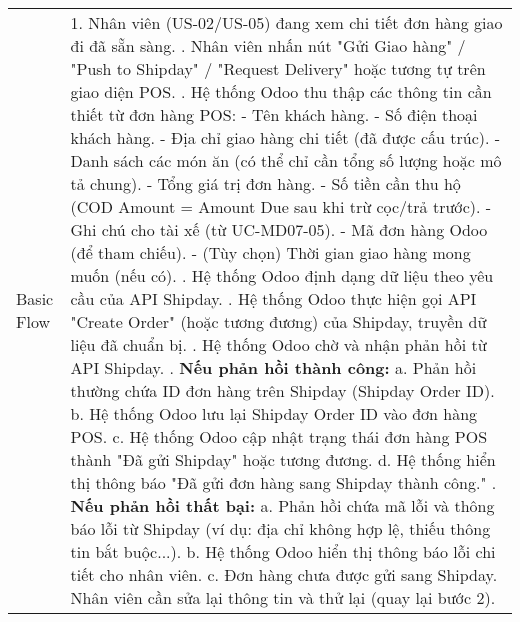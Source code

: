 \begin{longtable}{|m{4cm}|p{11cm}|}
Basic Flow & 1. Nhân viên (US-02/US-05) đang xem chi tiết đơn hàng giao đi đã sẵn sàng. \newline 2. Nhân viên nhấn nút "Gửi Giao hàng" / "Push to Shipday" / "Request Delivery" hoặc tương tự trên giao diện POS. \newline 3. Hệ thống Odoo thu thập các thông tin cần thiết từ đơn hàng POS: \newline    - Tên khách hàng. \newline    - Số điện thoại khách hàng. \newline    - Địa chỉ giao hàng chi tiết (đã được cấu trúc). \newline    - Danh sách các món ăn (có thể chỉ cần tổng số lượng hoặc mô tả chung). \newline    - Tổng giá trị đơn hàng. \newline    - Số tiền cần thu hộ (COD Amount = Amount Due sau khi trừ cọc/trả trước). \newline    - Ghi chú cho tài xế (từ UC-MD07-05). \newline    - Mã đơn hàng Odoo (để tham chiếu). \newline    - (Tùy chọn) Thời gian giao hàng mong muốn (nếu có). \newline 4. Hệ thống Odoo định dạng dữ liệu theo yêu cầu của API Shipday. \newline 5. Hệ thống Odoo thực hiện gọi API "Create Order" (hoặc tương đương) của Shipday, truyền dữ liệu đã chuẩn bị. \newline 6. Hệ thống Odoo chờ và nhận phản hồi từ API Shipday. \newline 7. \textbf{Nếu phản hồi thành công:} \newline    a. Phản hồi thường chứa ID đơn hàng trên Shipday (Shipday Order ID). \newline    b. Hệ thống Odoo lưu lại Shipday Order ID vào đơn hàng POS. \newline    c. Hệ thống Odoo cập nhật trạng thái đơn hàng POS thành "Đã gửi Shipday" hoặc tương đương. \newline    d. Hệ thống hiển thị thông báo "Đã gửi đơn hàng sang Shipday thành công." \newline 8. \textbf{Nếu phản hồi thất bại:} \newline    a. Phản hồi chứa mã lỗi và thông báo lỗi từ Shipday (ví dụ: địa chỉ không hợp lệ, thiếu thông tin bắt buộc...). \newline    b. Hệ thống Odoo hiển thị thông báo lỗi chi tiết cho nhân viên. \newline    c. Đơn hàng chưa được gửi sang Shipday. Nhân viên cần sửa lại thông tin và thử lại (quay lại bước 2). \\

\end{longtable}
